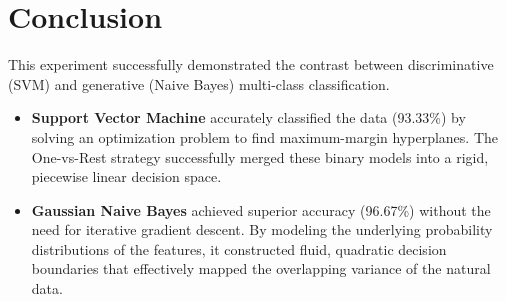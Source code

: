 \documentclass[11pt]{article}
\begin{document}
\section{Conclusion}
This experiment successfully demonstrated the contrast between discriminative (SVM) and generative (Naive Bayes) multi-class classification.
\begin{itemize}
    \item \textbf{Support Vector Machine} accurately classified the data (93.33\%) by solving an optimization problem to find maximum-margin hyperplanes. The One-vs-Rest strategy successfully merged these binary models into a rigid, piecewise linear decision space.
    \item \textbf{Gaussian Naive Bayes} achieved superior accuracy (96.67\%) without the need for iterative gradient descent. By modeling the underlying probability distributions of the features, it constructed fluid, quadratic decision boundaries that effectively mapped the overlapping variance of the natural data.
\end{itemize}


\renewcommand{\bibname}{References}

\end{document}
